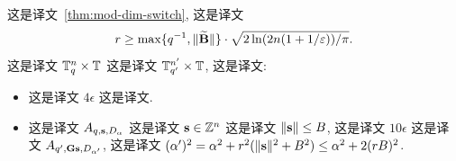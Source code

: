 \begin{lemma}
  \label{lem:reverse-main}  这是译文~\ref{thm:mod-dim-switch}, 这是译文  \[
	r
  \geq \max\{q^{-1}, \lVert\widetilde{\mathbf{B}}\rVert\} \cdot
  \sqrt{2\ln(2n(1+1/\varepsilon))/\pi}. 
	\] 这是译文 $\mathbb{T}_{q}^{n} \times \mathbb{T}$ 这是译文 $\mathbb{T}_{q'}^{n'} \times \mathbb{T}$, 这是译文:
  \begin{itemize}[itemsep=0pt]
  \item 这是译文 $4 \epsilon$ 这是译文.
  \item 这是译文  $A_{q,\mathbf{s},D_{\alpha}}$ 这是译文 $\mathbf{s} \in \mathbb{Z}^{n}$ 这是译文  $\lVert\mathbf{s}\rVert \leq B$, 这是译文 $10 \epsilon$ 这是译文 $A_{q',\mathbf{G}\mathbf{s},D_{\alpha'}}$, 这是译文  $(\alpha')^{2} = \alpha^{2} + r^{2}(\lVert\mathbf{s}\rVert^{2}+B^{2}) \leq
    \alpha^{2} + 2(rB)^{2}$. 
  \end{itemize}
\end{lemma}

